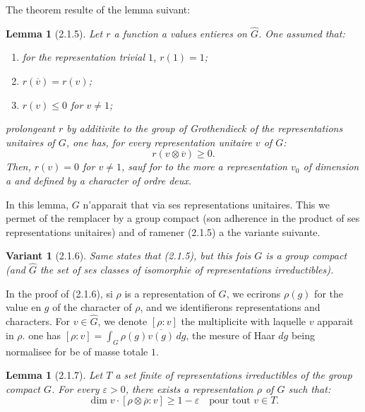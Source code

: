 \documentclass[12pt,a4paper]{article}
\theoremstyle{plain}
\newtheorem{lemma}[theorem]{Lemma}
\newtheorem{variante}[theorem]{Variant}
\theoremstyle{definition}
\theoremstyle{remark}
\begin{document}
The theorem resulte of the lemma suivant:

\begin{lemma}[2.1.5]
Let $r$ a function a values entieres on $\widehat{G}$. One assumed that:
\begin{enumerate}[label=\alph*)]
\item for the representation trivial $1$, $r(1) = 1$;
\item $r(\overline{v}) = r(v)$;
\item $r(v) \leq 0$ for $v \neq 1$;
\end{enumerate}
prolongeant $r$ by additivite to the group of Grothendieck of the representations unitaires of $G$, one has, for every representation unitaire $v$ of $G$:
\[ r(v \otimes \overline{v}) \geq 0. \]
Then, $r(v) = 0$ for $v \neq 1$, sauf for to the more a representation $v_0$ of dimension a and defined by a character of ordre deux.
\end{lemma}

In this lemma, $G$ n'apparait that via ses representations unitaires. This we permet of the remplacer by a group compact (son adherence in the product of ses representations unitaires) and of ramener (2.1.5) a the variante suivante.

\begin{variante}[2.1.6]
Same states that (2.1.5), but this fois $G$ is a group compact (and $\widehat{G}$ the set of ses classes of isomorphie of representations irreductibles).
\end{variante}

In the proof of (2.1.6), si $\rho$ is a representation of $G$, we ecrirons $\rho(g)$ for the value en $g$ of the character of $\rho$, and we identifierons representations and characters. For $v \in \widehat{G}$, we denote $[\rho : v]$ the multiplicite with laquelle $v$ apparait in $\rho$. one has $[\rho : v] = \int_G \rho(g) \overline{v(g)}\, dg$, the mesure of Haar $dg$ being normalisee for be of masse totale $1$.

\begin{lemma}[2.1.7]
Let $T$ a set finite of representations irreductibles of the group compact $G$. For every $\varepsilon > 0$, there exists a representation $\rho$ of $G$ such that:
\[ \dim v \cdot [\rho \otimes \overline{\rho} : v] \geq 1 - \varepsilon \quad \text{pour tout } v \in T. \]
\end{lemma}
\end{document}
